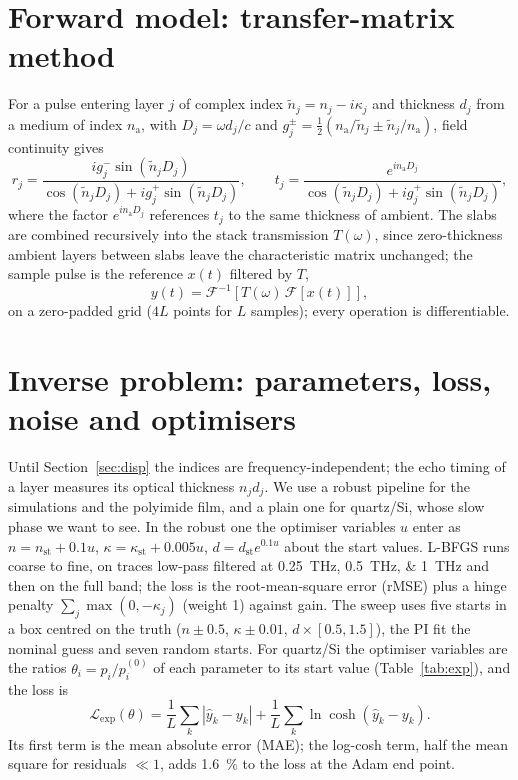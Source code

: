 \documentclass{optica-article}
\newcommand{\kap}{\kappa}
\newcommand{\Lt}{\mathcal{L}}
\begin{document}
\section{Forward model: transfer-matrix method}\label{sec:tmm}
For a pulse entering layer $j$ of complex index $\tilde n_j = n_j - i\kap_j$ and thickness $d_j$ from a medium of index $n_{\mathrm a}$, with $D_j=\omega d_j/c$ and $g_j^{\pm}=\tfrac12\left(n_{\mathrm a}/\tilde n_j\pm\tilde n_j/n_{\mathrm a}\right)$, field continuity gives \cite{BornWolf1999}
\begin{equation}
  r_j = \frac{ig_j^{-}\sin(\tilde n_j D_j)}{\cos(\tilde n_j D_j)+ig_j^{+}\sin(\tilde n_j D_j)}, \label{eq:r}\qquad
  t_j = \frac{e^{in_{\mathrm a}D_j}}{\cos(\tilde n_j D_j)+ig_j^{+}\sin(\tilde n_j D_j)},
\end{equation}
where the factor $e^{in_{\mathrm a}D_j}$ references $t_j$ to the same thickness of ambient. The slabs are combined recursively into the stack transmission $T(\omega)$, since zero-thickness ambient layers between slabs leave the characteristic matrix unchanged; the sample pulse is the reference $x(t)$ filtered by $T$,
\begin{equation}
  y(t)=\mathcal{F}^{-1}\!\left[T(\omega)\,\mathcal{F}[x(t)]\right],
  \label{eq:forward}
\end{equation}
on a zero-padded grid ($4L$ points for $L$ samples); every operation is differentiable.

\section{Inverse problem: parameters, loss, noise and optimisers}\label{sec:inverse}
Until Section~\ref{sec:disp} the indices are frequency-independent; the echo timing of a layer measures its optical thickness $n_jd_j$. We use a robust pipeline for the simulations and the polyimide film, and a plain one for quartz/Si, whose slow phase we want to see. In the robust one the optimiser variables $u$ enter as $n=n_{\mathrm{st}}+0.1u$, $\kap=\kap_{\mathrm{st}}+0.005u$, $d=d_{\mathrm{st}}e^{0.1u}$ about the start values. L-BFGS runs coarse to fine, on traces low-pass filtered at \SIlist{0.25;0.5;1}{THz} and then on the full band; the loss is the root-mean-square error (rMSE) plus a hinge penalty $\sum_j\max(0,-\kap_j)$ (weight 1) against gain. The sweep uses five starts in a box centred on the truth ($n\pm0.5$, $\kap\pm0.01$, $d\times[0.5,1.5]$), the PI fit the nominal guess and seven random starts. For quartz/Si the optimiser variables are the ratios $\theta_i=p_i/p_i^{(0)}$ of each parameter to its start value (Table~\ref{tab:exp}), and the loss is
\begin{equation}
  \Lt_{\mathrm{exp}}(\theta)=\frac{1}{L}\sum_k\left|\hat y_k-y_k\right| + \frac{1}{L}\sum_k \ln\cosh\!\left(\hat y_k-y_k\right).
  \label{eq:lossexp}
\end{equation}
Its first term is the mean absolute error (MAE); the log-cosh term, half the mean square for residuals $\ll1$, adds \SI{1.6}{\percent} to the loss at the Adam end point.
\end{document}
